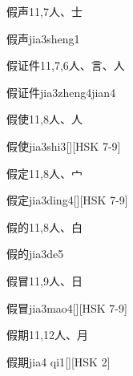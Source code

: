 \begin{Entry}{假声}{11,7}{⼈、⼠}
  \begin{Phonetics}{假声}{jia3sheng1}
  \end{Phonetics}
\end{Entry}

\begin{Entry}{假证件}{11,7,6}{⼈、⾔、⼈}
  \begin{Phonetics}{假证件}{jia3zheng4jian4}
  \end{Phonetics}
\end{Entry}

\begin{Entry}{假使}{11,8}{⼈、⼈}
  \begin{Phonetics}{假使}{jia3shi3}[][HSK 7-9]
  \end{Phonetics}
\end{Entry}

\begin{Entry}{假定}{11,8}{⼈、⼧}
  \begin{Phonetics}{假定}{jia3ding4}[][HSK 7-9]
  \end{Phonetics}
\end{Entry}

\begin{Entry}{假的}{11,8}{⼈、⽩}
  \begin{Phonetics}{假的}{jia3de5}
  \end{Phonetics}
\end{Entry}

\begin{Entry}{假冒}{11,9}{⼈、⽇}
  \begin{Phonetics}{假冒}{jia3mao4}[][HSK 7-9]
  \end{Phonetics}
\end{Entry}

\begin{Entry}{假期}{11,12}{⼈、⽉}
  \begin{Phonetics}{假期}{jia4 qi1}[][HSK 2]
  \end{Phonetics}
\end{Entry}

